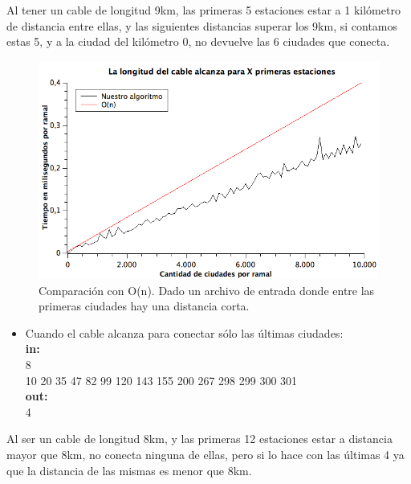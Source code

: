 Al tener un cable de longitud 9km, las primeras 5 estaciones estar a 1 kilómetro de distancia entre ellas, y las siguientes distancias superar los 9km, si contamos estas 5, y a la ciudad del kilómetro 0, no devuelve las 6 ciudades que conecta.\\

\begin{figure}[H]
\begin{center}

  \includegraphics[width=\linewidth]{../graficos/ej1/PrimerasCiudades.png}
  \caption{{\small Comparación con O(n). Dado un archivo de entrada donde entre las primeras ciudades hay una distancia corta.}} \label{ej1-tiempo-vs-cant-ciudadades-primeras-ciudades}
\endminipage

\end{center}
\end{figure}
\begin{itemize}
\item Cuando el cable alcanza para conectar sólo las últimas ciudades:\\
\textbf{in:}\\
8\\
10 20 35 47 82 99 120 143 155 200 267 298 299 300 301\\
\textbf{out:}\\
4\\
\end{itemize}

Al ser un cable de longitud 8km, y las primeras 12 estaciones estar a distancia mayor que 8km, no conecta ninguna de ellas, pero si lo hace con las últimas 4 ya que la distancia de las mismas es menor que 8km. \\

